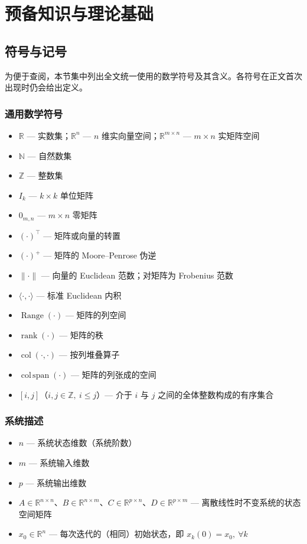 \chapter{预备知识与理论基础}

\section{符号与记号}

为便于查阅，本节集中列出全文统一使用的数学符号及其含义。各符号在正文首次出现时仍会给出定义。

\subsection*{通用数学符号}

\begin{itemize}
	\item $\mathbb{R}$ — 实数集；$\mathbb{R}^n$ — $n$ 维实向量空间；$\mathbb{R}^{m\times n}$ — $m\times n$ 实矩阵空间
	\item $\mathbb{N}$ — 自然数集
	\item $\mathbb{Z}$ — 整数集
	\item $I_k$ — $k\times k$ 单位矩阵
	\item $0_{m,n}$ — $m\times n$ 零矩阵
	\item $(\cdot)^\top$ — 矩阵或向量的转置
	\item $(\cdot)^+$ — 矩阵的 Moore--Penrose 伪逆
	\item $\|\cdot\|$ — 向量的 Euclidean 范数；对矩阵为 Frobenius 范数
	\item $\langle\cdot,\cdot\rangle$ — 标准 Euclidean 内积
	\item $\operatorname{Range}(\cdot)$ — 矩阵的列空间
	\item $\operatorname{rank}(\cdot)$ — 矩阵的秩
	\item $\operatorname{col}(\cdot,\cdot)$ — 按列堆叠算子
	\item $\operatorname{col\,span}(\cdot)$ — 矩阵的列张成的空间
	\item $[i,j]$（$i,j\in\mathbb{Z},\ i\leq j$）— 介于 $i$ 与 $j$ 之间的全体整数构成的有序集合
\end{itemize}

\subsection*{系统描述}

\begin{itemize}
	\item $n$ — 系统状态维数（系统阶数）
	\item $m$ — 系统输入维数
	\item $p$ — 系统输出维数
	\item $A\in\mathbb{R}^{n\times n}$、$B\in\mathbb{R}^{n\times m}$、$C\in\mathbb{R}^{p\times n}$、$D\in\mathbb{R}^{p\times m}$ — 离散线性时不变系统的状态空间矩阵
	\item $x_0\in\mathbb{R}^n$ — 每次迭代的（相同）初始状态，即 $x_k(0)=x_0,\ \forall k$
\end{itemize}

